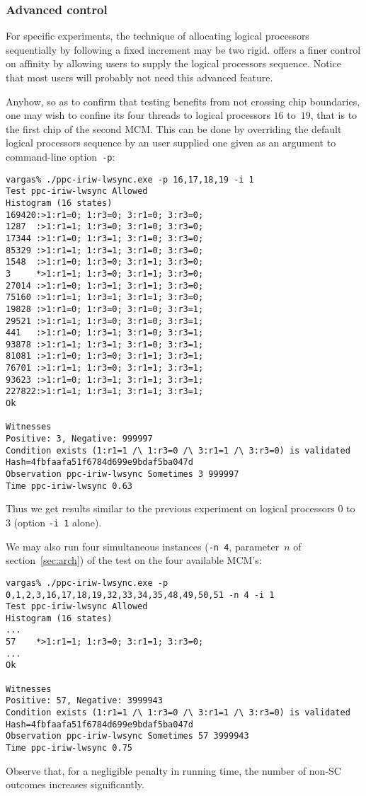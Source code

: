 \subsubsection{Advanced\label{affinity:advanced} control}
For specific experiments, the technique of
allocating logical processors sequentially by following a fixed increment
may be two rigid. \litmus{} offers a finer control on affinity by allowing
users to supply the logical processors sequence.
Notice that most users will probably not need this advanced feature.

Anyhow, so as to confirm that testing 
benefits from not crossing chip boundaries, one may wish to confine
its four threads to logical processors $16$ to~$19$,
that is to the first chip of the second MCM.
This can be done by overriding  the default logical processors sequence
by an user supplied one given as an argument to command-line
option~\texttt{-p}:
\begin{verbatim}
vargas% ./ppc-iriw-lwsync.exe -p 16,17,18,19 -i 1
Test ppc-iriw-lwsync Allowed
Histogram (16 states)
169420:>1:r1=0; 1:r3=0; 3:r1=0; 3:r3=0;
1287  :>1:r1=1; 1:r3=0; 3:r1=0; 3:r3=0;
17344 :>1:r1=0; 1:r3=1; 3:r1=0; 3:r3=0;
85329 :>1:r1=1; 1:r3=1; 3:r1=0; 3:r3=0;
1548  :>1:r1=0; 1:r3=0; 3:r1=1; 3:r3=0;
3     *>1:r1=1; 1:r3=0; 3:r1=1; 3:r3=0;
27014 :>1:r1=0; 1:r3=1; 3:r1=1; 3:r3=0;
75160 :>1:r1=1; 1:r3=1; 3:r1=1; 3:r3=0;
19828 :>1:r1=0; 1:r3=0; 3:r1=0; 3:r3=1;
29521 :>1:r1=1; 1:r3=0; 3:r1=0; 3:r3=1;
441   :>1:r1=0; 1:r3=1; 3:r1=0; 3:r3=1;
93878 :>1:r1=1; 1:r3=1; 3:r1=0; 3:r3=1;
81081 :>1:r1=0; 1:r3=0; 3:r1=1; 3:r3=1;
76701 :>1:r1=1; 1:r3=0; 3:r1=1; 3:r3=1;
93623 :>1:r1=0; 1:r3=1; 3:r1=1; 3:r3=1;
227822:>1:r1=1; 1:r3=1; 3:r1=1; 3:r3=1;
Ok

Witnesses
Positive: 3, Negative: 999997
Condition exists (1:r1=1 /\ 1:r3=0 /\ 3:r1=1 /\ 3:r3=0) is validated
Hash=4fbfaafa51f6784d699e9bdaf5ba047d
Observation ppc-iriw-lwsync Sometimes 3 999997
Time ppc-iriw-lwsync 0.63
\end{verbatim}
Thus we get results similar to the previous experiment on logical processors
$0$ to~$3$ (option \texttt{-i 1} alone).

We may also run four simultaneous instances (\texttt{-n 4}, parameter~$n$ of
section~\ref{sec:arch}) of the test on
the four available MCM's:
\begin{verbatim}
vargas% ./ppc-iriw-lwsync.exe -p 0,1,2,3,16,17,18,19,32,33,34,35,48,49,50,51 -n 4 -i 1
Test ppc-iriw-lwsync Allowed
Histogram (16 states)
...
57    *>1:r1=1; 1:r3=0; 3:r1=1; 3:r3=0;
...
Ok

Witnesses
Positive: 57, Negative: 3999943
Condition exists (1:r1=1 /\ 1:r3=0 /\ 3:r1=1 /\ 3:r3=0) is validated
Hash=4fbfaafa51f6784d699e9bdaf5ba047d
Observation ppc-iriw-lwsync Sometimes 57 3999943
Time ppc-iriw-lwsync 0.75
\end{verbatim}
Observe that, for a negligible penalty in running time, the number
of non-SC outcomes increases significantly.

